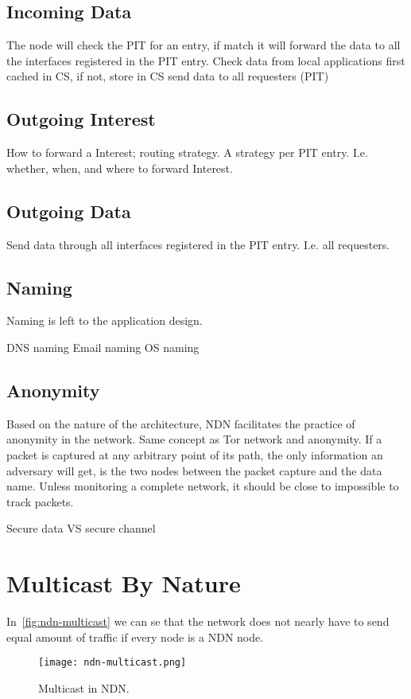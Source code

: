 \subsection{Incoming Data}
The node will check  the \gls{PIT} for an entry, if match it will forward the data to all the interfaces registered in the \gls{PIT} entry.
Check data from local applications first cached in \gls{CS}, if not, store in \gls{CS} send data to all requesters (\gls{PIT})

\subsection{Outgoing Interest}
How to forward a Interest; routing strategy. A strategy per \gls{PIT} entry. I.e. whether, when, and where to forward Interest.

\subsection{Outgoing Data}
Send data through all interfaces registered in the \gls{PIT} entry. I.e. all requesters.

\subsection{Naming}\label{naming}
Naming is left to the application design.

\gls{DNS} naming
Email naming
\gls{OS} naming

\subsection{Anonymity}
Based on the nature of the architecture, \gls{NDN} facilitates the practice of anonymity in the network. 
Same concept as Tor network and anonymity.
If a packet is captured at any arbitrary point of its path, the only information an adversary will get, is the two nodes between the packet capture and the data name. Unless monitoring a complete network, it should be close to impossible to track packets.  

Secure data VS secure channel

\section{Multicast By Nature}\label{ndn-multicast}

In~\autoref{fig:ndn-multicast} we can se that the network does not nearly have to send equal amount of traffic if every node is a \gls{NDN} node.
\begin{figure}[ht]
  \centering
  \texttt{[image: ndn-multicast.png]}
  \caption{Multicast in NDN.}
  \label{fig:ndn-multicast}
\end{figure}

